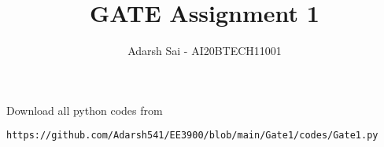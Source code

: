 \documentclass[journal,12pt,twocolumn]{IEEEtran}
\DeclareMathOperator*{\Res}{Res}
\begin{document}
\newcommand{\BEQA}{\begin{eqnarray}}
\newcommand{\EEQA}{\end{eqnarray}}
\newcommand{\define}{\stackrel{\triangle}{=}}

\raggedbottom
\setlength{\parindent}{0pt}
\providecommand{\mbf}{\mathbf}
\providecommand{\pr}[1]{\ensuremath{\Pr\left(#1\right)}}
\providecommand{\qfunc}[1]{\ensuremath{Q\left(#1\right)}}
\providecommand{\sbrak}[1]{\ensuremath{{}\left[#1\right]}}
\providecommand{\lsbrak}[1]{\ensuremath{{}\left[#1\right.}}
\providecommand{\rsbrak}[1]{\ensuremath{{}\left.#1\right]}}
\providecommand{\brak}[1]{\ensuremath{\left(#1\right)}}
\providecommand{\lbrak}[1]{\ensuremath{\left(#1\right.}}
\providecommand{\rbrak}[1]{\ensuremath{\left.#1\right)}}
\providecommand{\cbrak}[1]{\ensuremath{\left\{#1\right\}}}
\providecommand{\lcbrak}[1]{\ensuremath{\left\{#1\right.}}
\providecommand{\rcbrak}[1]{\ensuremath{\left.#1\right\}}}
\theoremstyle{remark}
\newtheorem{rem}{Remark}
\newcommand{\sgn}{\mathop{\mathrm{sgn}}}
\providecommand{\abs}[1]{\vert#1\vert}
\providecommand{\res}[1]{\Res\displaylimits_{#1}} 
\providecommand{\norm}[1]{\lVert#1\rVert}
\providecommand{\mtx}[1]{\mathbf{#1}}
\providecommand{\mean}[1]{E[ #1 ]}
\providecommand{\fourier}{\overset{\mathcal{F}}{ \rightleftharpoons}}
\providecommand{\system}{\overset{\mathcal{H}}{ \longleftrightarrow}}
\newcommand{\solution}{\noindent \textbf{Solution: }}
\newcommand{\cosec}{\,\text{cosec}\,}
\providecommand{\dec}[2]{\ensuremath{\overset{#1}{\underset{#2}{\gtrless}}}}
\newcommand{\myvec}[1]{\ensuremath{\begin{pmatrix}#1\end{pmatrix}}}
\newcommand{\mydet}[1]{\ensuremath{\begin{vmatrix}#1\end{vmatrix}}}
\makeatletter
{}
\makeatother
\let\StandardTheFigure\thefigure
\let\vec\mathbf
\renewcommand{\thefigure}{\theproblem}
\def\putbox#1#2#3{\makebox[0in][l]{\makebox[#1][l]{}\raisebox{\baselineskip}[0in][0in]{\raisebox{#2}[0in][0in]{#3}}}}
     \def\rightbox#1{\makebox[0in][r]{#1}}
     \def\centbox#1{\makebox[0in]{#1}}
     \def\topbox#1{\raisebox{-\baselineskip}[0in][0in]{#1}}
     \def\midbox#1{\raisebox{-0.5\baselineskip}[0in][0in]{#1}}
\vspace{3cm}
\title{GATE Assignment 1}
\author{Adarsh Sai - AI20BTECH11001}
\maketitle
\newpage
\bigskip
\renewcommand{\thefigure}{\theenumi}
\renewcommand{\thetable}{\theenumi}
Download all python codes from 
\begin{lstlisting}
https://github.com/Adarsh541/EE3900/blob/main/Gate1/codes/Gate1.py
\end{lstlisting}
\end{document}
